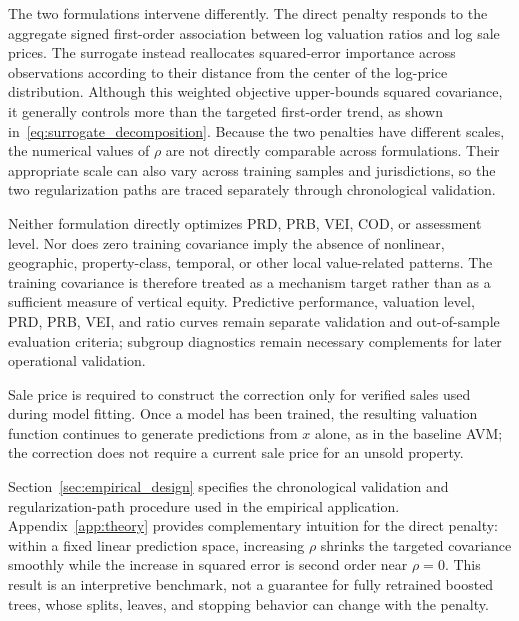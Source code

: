 \documentclass[10pt]{article}
\theoremstyle{definition}
\newcommand{\1}{\mathbf{1}}
\begin{document}
{The two formulations intervene differently. The direct penalty responds to the aggregate signed first-order association between log valuation ratios and log sale prices. The surrogate instead reallocates squared-error importance across observations according to their distance from the center of the log-price distribution. Although this weighted objective upper-bounds squared covariance, it generally controls more than the targeted first-order trend, as shown in~\eqref{eq:surrogate_decomposition}. Because the two penalties have different scales, the numerical values of $\rho$ are not directly comparable across formulations. Their appropriate scale can also vary across training samples and jurisdictions, so the two regularization paths are traced separately through chronological validation.}


{Neither formulation directly optimizes PRD, PRB, VEI, COD, or assessment level. Nor does zero training covariance imply the absence of nonlinear, geographic, property-class, temporal, or other local value-related patterns. The training covariance is therefore treated as a mechanism target rather than as a sufficient measure of vertical equity. Predictive performance, valuation level, PRD, PRB, VEI, and ratio curves remain separate validation and out-of-sample evaluation criteria; subgroup diagnostics remain necessary complements for later operational validation.}

{Sale price is required to construct the correction only for verified sales used during model fitting. Once a model has been trained, the resulting valuation function continues to generate predictions from $x$ alone, as in the baseline AVM; the correction does not require a current sale price for an unsold property.}

{Section~\ref{sec:empirical_design} specifies the chronological validation and regularization-path procedure used in the empirical application. Appendix~\ref{app:theory} provides complementary intuition for the direct penalty: within a fixed linear prediction space, increasing $\rho$ shrinks the targeted covariance smoothly while the increase in squared error is second order near $\rho=0$. This result is an interpretive benchmark, not a guarantee for fully retrained boosted trees, whose splits, leaves, and stopping behavior can change with the penalty.}
\end{document}
